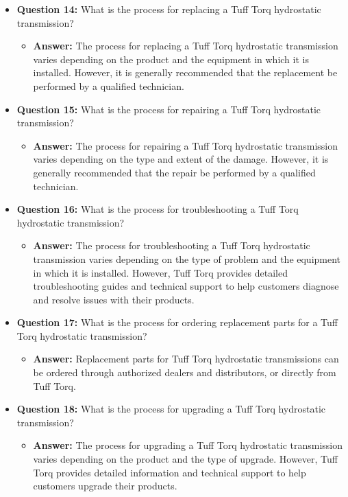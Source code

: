 \documentclass{article}
\begin{document}
\begin{itemize}
    \item \textbf{Question 14:} What is the process for replacing a Tuff Torq hydrostatic transmission?
    \begin{itemize}
        \item \textbf{Answer:} The process for replacing a Tuff Torq hydrostatic transmission varies depending on the product and the equipment in which it is installed. However, it is generally recommended that the replacement be performed by a qualified technician.
    \end{itemize}
    
    \item \textbf{Question 15:} What is the process for repairing a Tuff Torq hydrostatic transmission?
    \begin{itemize}
        \item \textbf{Answer:} The process for repairing a Tuff Torq hydrostatic transmission varies depending on the type and extent of the damage. However, it is generally recommended that the repair be performed by a qualified technician.
    \end{itemize}
    
    \item \textbf{Question 16:} What is the process for troubleshooting a Tuff Torq hydrostatic transmission?
    \begin{itemize}
        \item \textbf{Answer:} The process for troubleshooting a Tuff Torq hydrostatic transmission varies depending on the type of problem and the equipment in which it is installed. However, Tuff Torq provides detailed troubleshooting guides and technical support to help customers diagnose and resolve issues with their products.
    \end{itemize}
    
    \item \textbf{Question 17:} What is the process for ordering replacement parts for a Tuff Torq hydrostatic transmission?
    \begin{itemize}
        \item \textbf{Answer:} Replacement parts for Tuff Torq hydrostatic transmissions can be ordered through authorized dealers and distributors, or directly from Tuff Torq.
    \end{itemize}
    
    \item \textbf{Question 18:} What is the process for upgrading a Tuff Torq hydrostatic transmission?
    \begin{itemize}
        \item \textbf{Answer:} The process for upgrading a Tuff Torq hydrostatic transmission varies depending on the product and the type of upgrade. However, Tuff Torq provides detailed information and technical support to help customers upgrade their products.
    \end{itemize}
    

\end{itemize}
\end{document}
